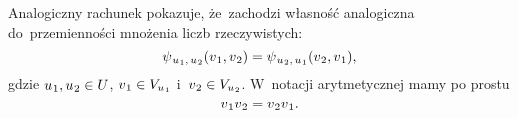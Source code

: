\documentclass[a4paper,11pt]{article}
\numberwithin{equation}{section}
\begin{document}
Analogiczny rachunek pokazuje,
że~zachodzi własność analogiczna do~przemienności mnożenia liczb
rzeczywistych:
\begin{equation}
  \label{eq:Mechanika-Rozwazania-ogolne-26}
  \psi_{ \hspace{0.07em} u_{ \hspace{0.05em} 1 }, \, u_{ \hspace{0.05em} 2 } }(
  v_{ \hspace{0.05em} 1 }, v_{ \hspace{0.05em} 2 } ) =
  \psi_{ \hspace{0.07em} u_{ \hspace{0.05em} 2 }, \, u_{ \hspace{0.05em} 1 } }(
  v_{ \hspace{0.05em} 2 }, v_{ \hspace{0.05em} 1 } ),
\end{equation}
gdzie $u_{ \hspace{0.05em} 1 }, u_{ \hspace{0.05em} 2 } \in U$,
$v_{ \hspace{0.05em} 1 } \in V_{ u_{ \hspace{0.05em} 1 } }$
i~$v_{ \hspace{0.05em} 2 } \in V_{ u_{ \hspace{0.05em} 2 } }$. W~notacji arytmetycznej
mamy po prostu
\begin{equation}
  \label{eq:Mechanika-Rozwazania-ogolne-27}
  v_{ \hspace{0.05em} 1 } v_{ \hspace{0.05em} 2 } =
  v_{ \hspace{0.05em} 2 } v_{ \hspace{0.05em} 1 }.
\end{equation}
\end{document}
